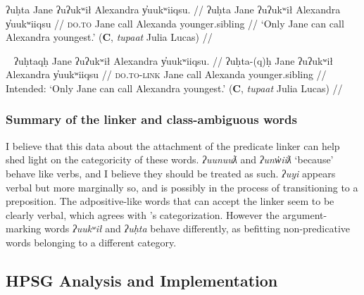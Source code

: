 \ex \label{ex:uhta}
\begingl
\glpreamble ʔuḥta Jane ʔuʔukʷił Alexandra y̓uukʷiiqsu. //
\gla ʔuḥta Jane ʔuʔukʷił Alexandra y̓uukʷiiqsu //
\glb \textsc{do.to} Jane call Alexanda younger.sibling //
\glft `Only Jane can call Alexandra youngest.' (\textbf{C}, \textit{tupaat} Julia Lucas) //
\endgl
\xe

\ex~ \label{ex:uhtaqh}
\begingl
\glpreamble *ʔuḥtaqḥ Jane ʔuʔukʷił Alexandra y̓uukʷiiqsu. //
\gla ʔuḥta-(q)ḥ Jane ʔuʔukʷił Alexandra y̓uukʷiiqsu //
\glb \textsc{do.to}-\textsc{link} Jane call Alexanda younger.sibling //
\glft Intended: `Only Jane can call Alexandra youngest.' (\textbf{C}, \textit{tupaat} Julia Lucas) //
\endgl
\xe

\subsubsection{Summary of the linker and class-ambiguous words}

I believe that this data about the attachment of the predicate linker can help shed light on the categoricity of these words. \textit{ʔuunuuƛ} and \textit{ʔunw̓iiƛ} `because' behave like verbs, and I believe they should be treated as such. \textit{ʔuyi} appears verbal but more marginally so, and is possibly in the process of transitioning to a preposition. The adpositive-like words that can accept the linker seem to be clearly verbal, which agrees with \cite{woo2007b}'s categorization. However the argument-marking words \textit{ʔuukʷił} and \textit{ʔuḥta} behave differently, as befitting non-predicative words belonging to a different category.

\subsection{HPSG Analysis and Implementation} \label{sec:link:analysis}

